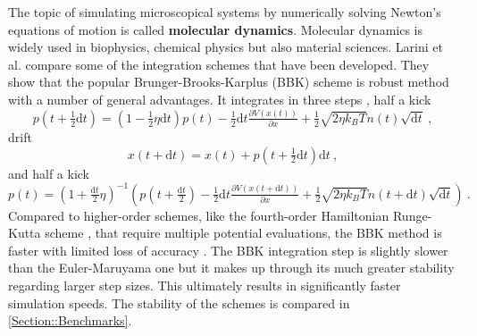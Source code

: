 	The topic of simulating microscopical systems by numerically solving Newton's equations of motion is called \textbf{molecular dynamics}. Molecular dynamics is widely used in biophysics, chemical physics but also material sciences. Larini et al. \cite{larini2007langevin} compare some of the integration schemes that have been developed. They show that the popular Brunger-Brooks-Karplus (BBK) \cite{brunger1984stochastic} scheme is robust method with a number of general advantages. It integrates in three steps \cite{izaguirre2001langevin}, half a kick
	\begin{equation}
		p\left(t + \tfrac{1}{2} \text{d}t \right) =	\left(1 - \tfrac{1}{2} \eta \text{d}t \right) p(t) - \tfrac{1}{2} \text{d}t \tfrac{\partial V(x(t))}{\partial x} + \tfrac{1}{2} \sqrt{2\eta{k_B T}} n(t) \sqrt{\text{d}t}~,
	\end{equation}
	drift
	\begin{equation}
		x(t + \text{d}t) = x(t) +  p\left(t + \tfrac{1}{2} \text{d}t\right) \text{d}t~,
	\end{equation}
	and half a kick
	\begin{equation}
		p\left(t\right) =	\left(1 + \tfrac{\text{d}t}{2} \eta \right)^{-1} \left( p\left(t + \tfrac{\text{d}t}{2}\right) - \tfrac{1}{2} \text{d}t \tfrac{\partial V(x(t + \text{d}t))}{\partial x} + \tfrac{1}{2} \sqrt{2\eta{k_B T}} n({t + \text{d}t}) \sqrt{\text{d}t} \right) ~.
	\end{equation}
	Compared to higher-order schemes, like the fourth-order Hamiltonian Runge-Kutta scheme \cite{press2002numerical}, that require multiple potential evaluations, the BBK method is faster with limited loss of accuracy \cite{larini2007langevin}. The BBK integration step is slightly slower than the Euler-Maruyama one but it makes up through its much greater stability regarding larger step sizes. This ultimately results in significantly faster simulation speeds. The stability of the schemes is compared in \autoref{Section::Benchmarks}. \\
	
